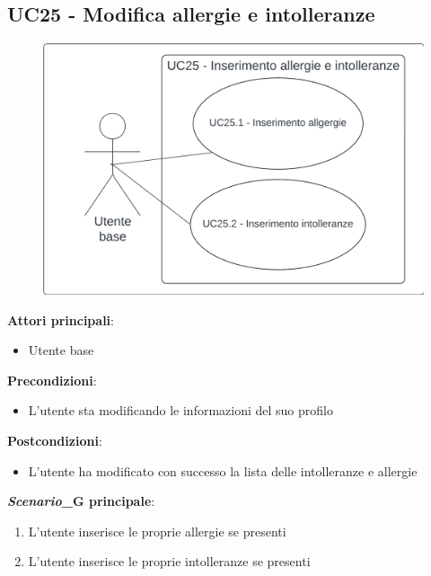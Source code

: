 \subsection{UC25 - Modifica allergie e intolleranze}\label{usecase:25}
\begin{figure}[H]
    \centering
    \includegraphics[width=0.75\linewidth]{ucd/ucd25.png}
\end{figure}
\textbf{Attori principali}:
\begin{itemize}
    \item Utente base
\end{itemize}
\textbf{Precondizioni}:
\begin{itemize}
    \item L'utente sta modificando le informazioni del suo profilo
\end{itemize}
\textbf{Postcondizioni}:
\begin{itemize}
    \item L'utente ha modificato con successo la lista delle intolleranze e allergie
\end{itemize}
\textbf{\textit{Scenario}_G principale}:
\begin{enumerate}
    \item L'utente inserisce le proprie allergie se presenti
    \item L'utente inserisce le proprie intolleranze se presenti
\end{enumerate}

  
